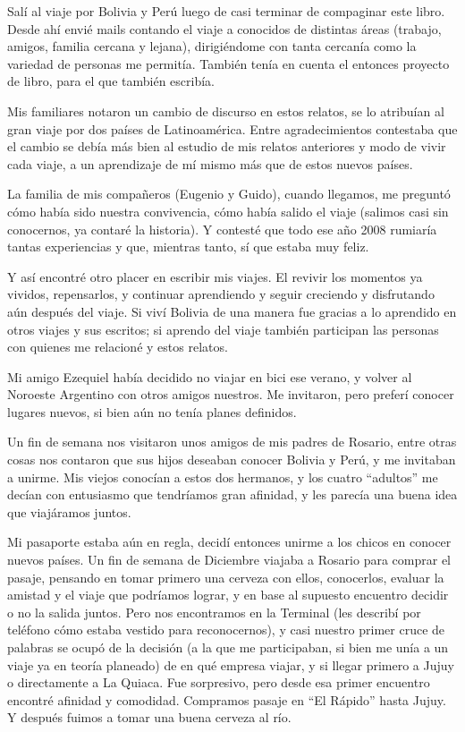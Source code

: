 
Salí al viaje por Bolivia y Perú luego de casi terminar de compaginar este
libro. Desde ahí envié mails contando el viaje a conocidos de distintas áreas
(trabajo, amigos, familia cercana y lejana), dirigiéndome con tanta cercanía
como la variedad de personas me permitía. También tenía en cuenta el entonces
proyecto de libro, para el que también escribía.

Mis familiares notaron un cambio de discurso en estos relatos, se lo atribuían
al gran viaje por dos países de Latinoamérica. Entre agradecimientos
contestaba que el cambio se debía más bien al estudio de mis relatos
anteriores y modo de vivir cada viaje, a un aprendizaje de mí mismo más que de
estos nuevos países.

La familia de mis compañeros (Eugenio y Guido), cuando llegamos, me preguntó
cómo había sido nuestra convivencia, cómo había salido el viaje (salimos
casi sin conocernos, ya contaré la historia). Y contesté que todo ese año
2008 rumiaría tantas experiencias y que, mientras tanto, sí que estaba muy
feliz.

Y así encontré otro placer en escribir mis viajes. El revivir los momentos ya
vividos, repensarlos, y continuar aprendiendo y seguir creciendo y disfrutando
aún después del viaje. Si viví Bolivia de una manera fue gracias a lo
aprendido en otros viajes y sus escritos; si aprendo del viaje también
participan las personas con quienes me relacioné y estos relatos.

Mi amigo Ezequiel había decidido no viajar en bici ese verano, y volver al
Noroeste Argentino con otros amigos nuestros. Me invitaron, pero preferí
conocer lugares nuevos, si bien aún no tenía planes definidos.

Un fin de semana nos visitaron unos amigos de mis padres de Rosario, entre otras
cosas nos contaron que sus hijos deseaban conocer Bolivia y Perú, y me
invitaban a unirme. Mis viejos conocían a estos dos hermanos, y los cuatro
``adultos'' me decían con entusiasmo que tendríamos gran afinidad, y les
parecía una buena idea que viajáramos juntos.

Mi pasaporte estaba aún en regla, decidí entonces unirme a los chicos en
conocer nuevos países. Un fin de semana de Diciembre viajaba a Rosario para
comprar el pasaje, pensando en tomar primero una cerveza con ellos, conocerlos,
evaluar la amistad y el viaje que podríamos lograr, y en base al supuesto
encuentro decidir o no la salida juntos. Pero nos encontramos en la Terminal
(les describí por teléfono cómo estaba vestido para reconocernos), y casi
nuestro primer cruce de palabras se ocupó de la decisión (a la que me
participaban, si bien me unía a un viaje ya en teoría planeado) de en qué
empresa viajar, y si llegar primero a Jujuy o directamente a La Quiaca. Fue
sorpresivo, pero desde esa primer encuentro encontré afinidad y comodidad.
Compramos pasaje en ``El Rápido'' hasta Jujuy. Y después fuimos a tomar una
buena cerveza al río.

